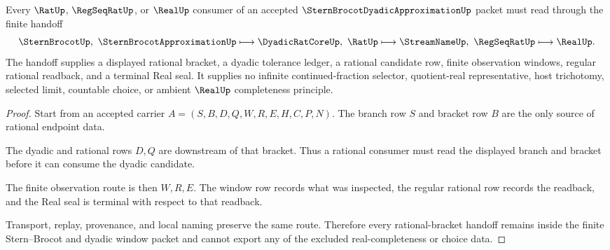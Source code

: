 \begin{theorem}
\label{thm:stern-brocot-dyadic-approximation-rational-bracket-handoff}
Every $\RatUp$, $\RegSeqRatUp$, or $\RealUp$ consumer of an accepted $\SternBrocotDyadicApproximationUp$ packet must read through the finite handoff
$$
\SternBrocotUp,\ \SternBrocotApproximationUp \longmapsto \DyadicRatCoreUp,\ \RatUp \longmapsto \StreamNameUp,\ \RegSeqRatUp \longmapsto \RealUp .
$$
The handoff supplies a displayed rational bracket, a dyadic tolerance ledger, a rational candidate row, finite observation windows, regular rational readback, and a terminal Real seal. It supplies no infinite continued-fraction selector, quotient-real representative, host trichotomy, selected limit, countable choice, or ambient $\RealUp$ completeness principle.
\end{theorem}
\begin{proof}
Start from an accepted carrier $A=(S,B,D,Q,W,R,E,H,C,P,N)$. The branch row $S$ and bracket row $B$ are the only source of rational endpoint data.

The dyadic and rational rows $D,Q$ are downstream of that bracket. Thus a rational consumer must read the displayed branch and bracket before it can consume the dyadic candidate.

The finite observation route is then $W,R,E$. The window row records what was inspected, the regular rational row records the readback, and the Real seal is terminal with respect to that readback.

Transport, replay, provenance, and local naming preserve the same route. Therefore every rational-bracket handoff remains inside the finite Stern--Brocot and dyadic window packet and cannot export any of the excluded real-completeness or choice data.
\end{proof}


